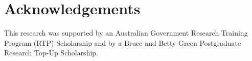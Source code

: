 \chapter{Acknowledgements}
\label{ch:acknowledgements}

This research was supported
by an Australian Government Research Training Program (RTP) Scholarship
and by a Bruce and Betty Green Postgraduate Research Top-Up Scholarship.
